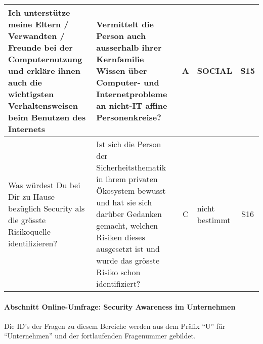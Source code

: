 \documentclass[../../main.tex]{subfiles}
\begin{document}
\begin{table}[H]
\begin{tabular}{ |p{5.5cm}|p{5.5cm}|c|p{2.5cm}|c|}
Ich unterstütze meine Eltern / Verwandten / Freunde bei der Computernutzung und erkläre ihnen auch die wichtigsten Verhaltensweisen beim Benutzen des Internets &  Vermittelt die Person auch ausserhalb ihrer Kernfamilie Wissen über Computer- und Internetprobleme an nicht-IT affine Personenkreise? & A & SOCIAL & S15 \\
\hline

Was würdest Du bei Dir zu Hause bezüglich Security als die grösste Risikoquelle identifizieren? &  Ist sich die Person der Sicherheitsthematik in ihrem privaten Ökosystem bewusst und hat sie sich darüber Gedanken gemacht, welchen Risiken dieses ausgesetzt ist und wurde das grösste Risiko schon identifiziert? & C & nicht bestimmt & S16 \\
\hline

\end{tabular}
\end{table}



\paragraph*{Abschnitt Online-Umfrage: Security Awareness im Unternehmen}\mbox{}

\begin{sloppypar}
Die ID's der Fragen zu diesem Bereiche werden aus dem Präfix "`U"' für "`Unternehmen"' und der fortlaufenden Fragenummer gebildet.
\end{sloppypar}


\sloppy 
\end{document}
